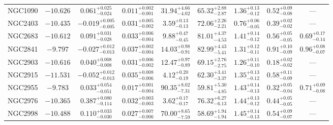 \documentclass[twocolumn,tighten]{aastex63}
\begin{document}
\begin{table}
\begin{center}
\begin{tabular}{lcccccccc}
    NGC1090 & $ -10.626 $ & $ 0.061 _{ -0.024 } ^{ + 0.025 } $ & $ 0.011 _{ -0.001 } ^{ + 0.002 } $ & $ 31.94 _{ -4.02 } ^{ + 4.66 } $ & $ 65.32 _{ -2.87 } ^{ + 2.88 } $ & $ 1.36 _{ -0.12 } ^{ + 0.13 } $ & $ 0.52 _{ -0.08 } ^{ + 0.09 } $ & --- \\  
    NGC2403 & $ -10.435 $ & $ -0.019 _{ -0.005 } ^{ + 0.005 } $ & $ 0.031 _{ -0.002 } ^{ + 0.005 } $ & $ 3.59 _{ -0.13 } ^{ + 0.13 } $ & $ 72.06 _{ -2.21 } ^{ + 2.26 } $ & $ 0.76 _{ -0.05 } ^{ + 0.06 } $ & $ 0.39 _{ -0.02 } ^{ + 0.02 } $ & --- \\  
    NGC2683 & $ -10.612  $ & $ 0.091 _{ -0.028 } ^{ + 0.031 } $ & $ 0.033 _{ -0.004 } ^{ + 0.006 } $ & $ 9.88 _{ -0.45 } ^{ + 0.47 } $ & $ 81.01 _{ -4.53 } ^{ + 4.37 } $ & $ 1.41 _{ -0.12 } ^{ + 0.14 } $ & $ 0.56 _{ -0.05 } ^{ + 0.05 } $ & $ 0.69 _{ -0.14 } ^{ + 0.17 } $  \\  
    NGC2841 & $ -9.797  $ & $ -0.027 _{ -0.013 } ^{ + 0.012 } $ & $ 0.037 _{ -0.004 } ^{ + 0.002 } $ & $ 14.03 _{ -0.91 } ^{ + 0.98 } $ & $ 82.99 _{ -5.41 } ^{ + 4.43 } $ & $ 1.31 _{ -0.11 } ^{ + 0.12 } $ & $ 0.91 _{ -0.09 } ^{ + 0.10 } $ & $ 0.96 _{ -0.07 } ^{ + 0.08 } $  \\  
    NGC2903 & $ -10.616 $ & $ 0.040 _{ -0.008 } ^{ + 0.008 } $ & $ 0.031 _{ -0.002 } ^{ + 0.006 } $ & $ 12.47 _{ -0.89 } ^{ + 0.97 } $ & $ 69.15 _{ -2.75 } ^{ + 2.76 } $ & $ 1.26 _{ -0.10 } ^{ + 0.11 } $ & $ 0.18 _{ -0.02 } ^{ + 0.02 } $ & --- \\  
    NGC2915 & $ -11.531 $ & $ -0.052 _{ -0.013 } ^{ + 0.012 } $ & $ 0.035 _{ -0.006 } ^{ + 0.008 } $ & $ 4.12 _{ -0.19 } ^{ + 0.20 } $ & $ 62.30 _{ -3.37 } ^{ + 3.41 } $ & $ 1.35 _{ -0.12 } ^{ + 0.13 } $ & $ 0.58 _{ -0.09 } ^{ + 0.11 } $ & --- \\  
    NGC2955 & $ -9.783  $ & $ 0.033 _{ -0.051 } ^{ + 0.054 } $ & $ 0.017 _{ -0.004 } ^{ + 0.001 } $ & $ 90.35 _{ -7.31 } ^{ + 8.02 } $ & $ 59.81 _{ -4.85 } ^{ + 5.30 } $ & $ 1.43 _{ -0.13 } ^{ + 0.14 } $ & $ 0.32 _{ -0.04 } ^{ + 0.05 } $ & $ 0.71 _{ -0.08 } ^{ + 0.09 } $  \\  
    NGC2976 & $ -10.365 $ & $ 0.387 _{ -0.114 } ^{ + 0.080 } $ & $ 0.032 _{ -0.003 } ^{ + 0.003 } $ & $ 3.62 _{ -0.17 } ^{ + 0.17 } $ & $ 76.32 _{ -6.13 } ^{ + 6.27 } $ & $ 1.44 _{ -0.12 } ^{ + 0.13 } $ & $ 0.44 _{ -0.05 } ^{ + 0.05 } $ & --- \\  
    NGC2998 & $ -10.488 $ & $ 0.110 _{ -0.030 } ^{ + 0.033 } $ & $ 0.027 _{ -0.006 } ^{ + 0.007 } $ & $ 70.00 _{ -7.59 } ^{ + 8.65 } $ & $ 58.69 _{ -1.94 } ^{ + 1.94 } $ & $ 1.45 _{ -0.13 } ^{ + 0.14 } $ & $ 0.54 _{ -0.07 } ^{ + 0.09 } $ & --- \\  

\end{tabular}
\end{center}
\end{table}
\end{document}
